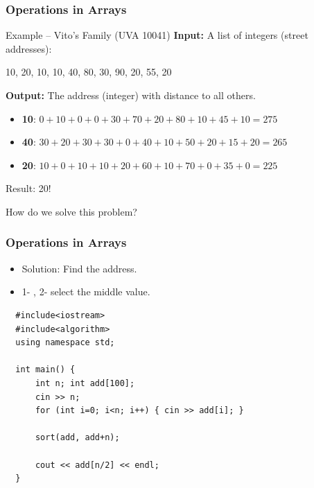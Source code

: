 \documentclass{beamer}
\begin{document}
\begin{frame}
  \frametitle{Operations in Arrays}

  \begin{block}{Example -- Vito's Family (UVA 10041)}
    {\bf Input:} A list of integers (street addresses):\\

    \smallskip

    10, 20, 10, 10, 40, 80, 30, 90, 20, 55, 20

    \bigskip

    {\bf Output:} The address (integer) with  distance to all others.
    \begin{itemize}
      \item {\bf 10}: $0+10+0+0+30+70+20+80+10+45+10 = 275$
      \item {\bf 40}: $30+20+30+30+0+40+10+50+20+15+20 = 265$
      \item {\bf 20}: $10+0+10+10+20+60+10+70+0+35+0 = 225$
    \end{itemize}

    \bigskip

    Result: 20!

  \end{block}

  \bigskip

  How do we solve this problem?

\end{frame}

\begin{frame}[fragile]
  \frametitle{Operations in Arrays}

  \begin{itemize}
  \item Solution: Find the  address.
  \item 1- , 2- select the middle value.
  \end{itemize}

\begin{verbatim}
  #include<iostream>
  #include<algorithm>
  using namespace std;

  int main() {
      int n; int add[100];
      cin >> n;
      for (int i=0; i<n; i++) { cin >> add[i]; }

      sort(add, add+n);

      cout << add[n/2] << endl;
  }
\end{verbatim}
\end{frame}
\end{document}
